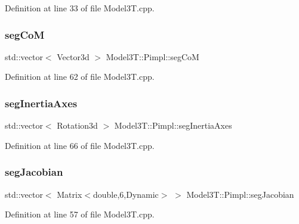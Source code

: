 Definition at line 33 of file Model3\+T.\+cpp.

\hypertarget{structModel3T_1_1Pimpl_add8bdb5e94533189b2173a43102eee84}{}\label{structModel3T_1_1Pimpl_add8bdb5e94533189b2173a43102eee84} 
\subsubsection{\texorpdfstring{seg\+CoM}{segCoM}}
{\footnotesize\ttfamily std\+::vector$<$ Vector3d $>$ Model3\+T\+::\+Pimpl\+::seg\+CoM}



Definition at line 62 of file Model3\+T.\+cpp.

\hypertarget{structModel3T_1_1Pimpl_aeb0889ba54a539cba37b30d2826ad61b}{}\label{structModel3T_1_1Pimpl_aeb0889ba54a539cba37b30d2826ad61b} 
\subsubsection{\texorpdfstring{seg\+Inertia\+Axes}{segInertiaAxes}}
{\footnotesize\ttfamily std\+::vector$<$ Rotation3d $>$ Model3\+T\+::\+Pimpl\+::seg\+Inertia\+Axes}



Definition at line 66 of file Model3\+T.\+cpp.

\hypertarget{structModel3T_1_1Pimpl_ab1a67acf0553a0bf04275f5f20c2a69e}{}\label{structModel3T_1_1Pimpl_ab1a67acf0553a0bf04275f5f20c2a69e} 
\subsubsection{\texorpdfstring{seg\+Jacobian}{segJacobian}}
{\footnotesize\ttfamily std\+::vector$<$ Matrix$<$double,6,Dynamic$>$ $>$ Model3\+T\+::\+Pimpl\+::seg\+Jacobian}



Definition at line 57 of file Model3\+T.\+cpp.

\hypertarget{structModel3T_1_1Pimpl_af9cd027badf0a713437cd6d1a924cfb6}{}\label{structModel3T_1_1Pimpl_af9cd027badf0a713437cd6d1a924cfb6} 
